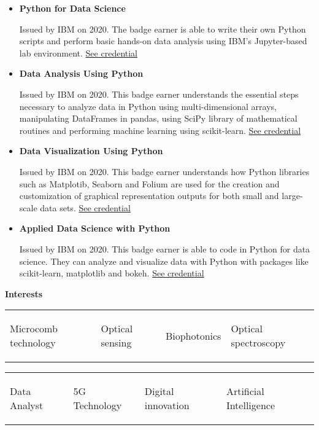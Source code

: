 \documentclass[letterpaper, 12pt]{article}[leftmargin=*]
\renewcommand{\section}[2]{
  \colorbox{secondary}{\color{white}\raggedbottom\normalsize\textbf{{#1}{\hspace{7pt}#2}}}
}
\newcommand{\resumeEntryStart}{\begin{itemize}[leftmargin=2.5mm]\itemsep8pt}
\newcommand{\resumeEntryEnd}{\end{itemize}}
\newcommand{\resumeItemListStart}{\begin{itemize}[leftmargin=4.5mm]\itemsep-3pt}
\newcommand{\resumeItemListEnd}{\end{itemize}}
\newcommand{\resumeItem}[1]{
  \item\small{
    {#1}
  }
}
\newcommand{\resumeEntryS}[2]{
  \item[]\small{
    \textbf{\color{primary}#1 }{ #2 }
  }
}
\newcommand{\fourthcol}[4]{
	\vspace{-0.3cm}
	\begin{tabularx}{\textwidth}{XXXX}
		{\small#1} & {\small#2} & {\small#3} & {\small#4}
	\end{tabularx}
}
\begin{document}
\resumeItemListStart
\resumeItem{\textbf{Python for Data Science}\par
\vspace{-0.2cm}
{\footnotesize Issued by IBM on 2020. The badge earner is able to write their own Python scripts and perform basic hands-on data analysis using IBM's Jupyter-based lab environment. \href{https://www.youracclaim.com/badges/0f8785bb-1050-4da5-8dd3-15d8bf1d68a8}{See credential \faExternalLink}}}
\vspace{0.1cm}
\resumeItem{\textbf{Data Analysis Using Python}\par
\vspace{-0.2cm}
{\footnotesize Issued by IBM on 2020. This badge earner understands the essential steps necessary to analyze data in Python using multi-dimensional arrays, manipulating DataFrames in pandas, using SciPy library of mathematical routines and performing machine learning using scikit-learn. \href{https://www.youracclaim.com/badges/6254609b-3350-47b3-83e9-d7e6ff2a1daa}{See credential \faExternalLink}}}
\vspace{0.1cm}
\resumeItem{\textbf{Data Visualization Using Python}\par
\vspace{-0.2cm}
{\footnotesize Issued by IBM on 2020. This badge earner understands how Python libraries such as Matplotib, Seaborn and Folium are used for the creation and customization of graphical representation outputs for both small and large-scale data sets. \href{https://www.youracclaim.com/badges/6e5beb76-93e0-4f62-9a4d-6de24671215f}{See credential \faExternalLink}}}
\vspace{0.1cm}
\resumeItem{\textbf{Applied Data Science with Python}\par
\vspace{-0.2cm}
{\footnotesize Issued by IBM on 2020. This badge earner is able to code in Python for data science. They can analyze and visualize data with Python with packages like scikit-learn, matplotlib and bokeh. \href{https://www.youracclaim.com/badges/fb8ee1fc-0a04-4027-ad0e-21179858d327}{See credential \faExternalLink}}}
\resumeItemListEnd

\section{\faThumbTack}{Interests}
\vspace{-0.75cm}
\resumeEntryStart
\small
\fourthcol{\resumeEntryS{}{\item Microcomb technology}}{\resumeEntryS{}{\item Optical sensing}}{\resumeEntryS{}{\item Biophotonics}}{\resumeEntryS{}{\item Optical spectroscopy}}
\vspace{-0.75cm}
\fourthcol{\resumeEntryS{}{\item Data Analyst}}{\resumeEntryS{}{\item 5G Technology}}{\resumeEntryS{}{\item Digital innovation}}{\resumeEntryS{}{\item Artificial Intelligence}}
\resumeEntryEnd
\end{document}
